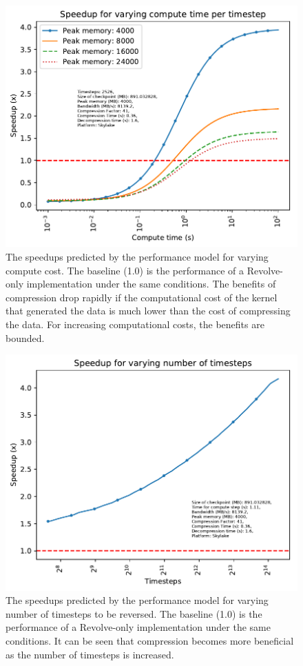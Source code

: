\begin{figure}
\begin{center}
\includegraphics[width=0.9\linewidth]{images/varying-compute.pdf}
\end{center}
\caption{The speedups predicted by the performance model for varying
  compute cost. The baseline
(1.0) is the performance of a Revolve-only implementation under the
same conditions. The benefits of compression drop rapidly if the
computational cost of the kernel that generated the data is much lower
than the cost of compressing the data. For increasing computational
costs, the benefits are bounded.}
\label{fig:varying_compute}
\end{figure}

\begin{figure}
\begin{center}
\includegraphics[width=0.9\linewidth]{images/varying-nt.pdf}
\end{center}
\caption{The speedups predicted by the performance model for varying
  number of timesteps to be reversed. The baseline
(1.0) is the performance of a Revolve-only implementation under the
same conditions. It can be seen that compression becomes more
beneficial as the number of timesteps is increased.}
\label{fig:varying_nt}
\end{figure}